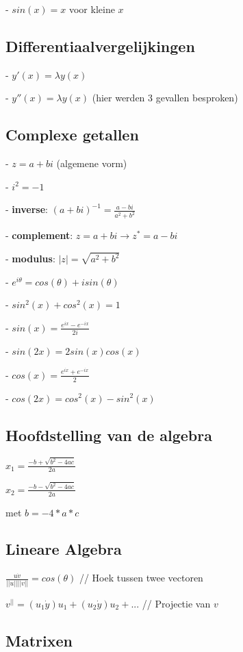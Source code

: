 \documentclass[a4paper]{article}
\begin{document}
- $sin(x) = x$ voor kleine $x$

\subsection*{Differentiaalvergelijkingen}

- $y'(x) = \lambda y(x)$

- $y''(x) = \lambda y(x)$ (hier werden 3 gevallen besproken)

\subsection*{Complexe getallen}

- $z = a + bi$ (algemene vorm)

- $i^2 = -1$

- \textbf{inverse}: $(a + bi)^{-1} = \frac{a - bi}{a^2 + b^2}$

- \textbf{complement}: $z = a + bi \rightarrow z^* = a - bi$

- \textbf{modulus}: $|z| = \sqrt{a^2 + b^2}$

- $e^{i\theta} = cos(\theta) + i sin(\theta)$

- $sin^2(x) + cos^2(x) = 1$

- $sin(x) = \frac{e^{ix} - e^{-ix}}{2i}$

- $sin(2x) = 2sin(x)cos(x)$

- $cos(x) = \frac{e^{ix} + e^{-ix}}{2}$

- $cos(2x) = cos^2(x) - sin^2(x)$

\subsection*{Hoofdstelling van de algebra}

$x_1 = \frac{-b + \sqrt{b^2 - 4ac}}{2a}$

$x_2 = \frac{-b - \sqrt{b^2 - 4ac}}{2a}$

met $b = -4*a*c$

\subsection*{Lineare Algebra}

$\frac{u\dot v}{||u|| ||v||} = cos(\theta)$ // Hoek tussen twee vectoren

$v^{||} = (u_1 \dot y) u_1 + (u_2 \dot y) u_2 + ...$ // Projectie van $v$

\subsection*{Matrixen}
\end{document}
